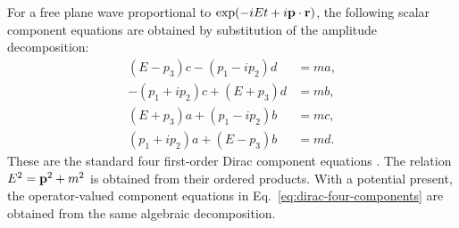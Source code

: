 For a free plane wave proportional to
\(\exp(-iEt+i\mathbf{p}\cdot\mathbf{r})\), the following scalar component
equations are obtained by substitution of the amplitude decomposition:
\begin{align*}
(E-p_3)c-(p_1-ip_2)d&=ma,\\
-(p_1+ip_2)c+(E+p_3)d&=mb,\\
(E+p_3)a+(p_1-ip_2)b&=mc,\\
(p_1+ip_2)a+(E-p_3)b&=md.
\end{align*}
These are the standard four first-order Dirac component equations
\cite{dirac1928,greiner2000}. The relation
\(E^2=\mathbf{p}^2+m^2\) is obtained from their ordered products. With a
potential present, the operator-valued component equations in
Eq.\ \eqref{eq:dirac-four-components} are obtained from the same algebraic
decomposition.

